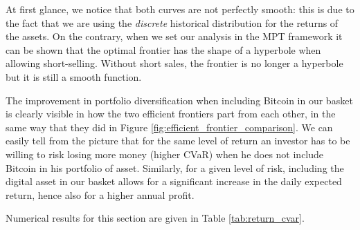 At first glance, we notice that both curves are not perfectly smooth: this is due to the fact that we are using the \textit{discrete} historical distribution for the returns of the assets. On the contrary, when we set our analysis in the MPT framework it can be shown that the optimal frontier has the shape of a hyperbole when allowing short-selling. Without short sales, the frontier is no longer a hyperbole but it is still a smooth function.

The improvement in portfolio diversification when including Bitcoin in our basket is clearly visible in how the two efficient frontiers part from each other, in the same way that they did in Figure \ref{fig:efficient_frontier_comparison}.
We can easily tell from the picture that for the same level of return an investor has to be willing to risk losing more money (higher CVaR) when he does not include Bitcoin in his portfolio of asset.
Similarly, for a given level of risk, including the digital asset in our basket allows for a significant increase in the daily expected return,  hence also for a higher annual profit.

Numerical results for this section are given in Table \ref{tab:return_cvar}.

